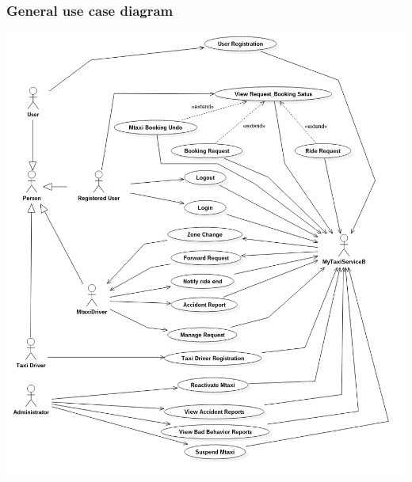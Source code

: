 \documentclass[11pt,titlepage]{article} %
\begin{document}
	\subsubsection{General use case diagram}
	\begin{center}
	\includegraphics[scale=0.49]{usecaseGeneral.png}
	\end{center}
\end{document}
